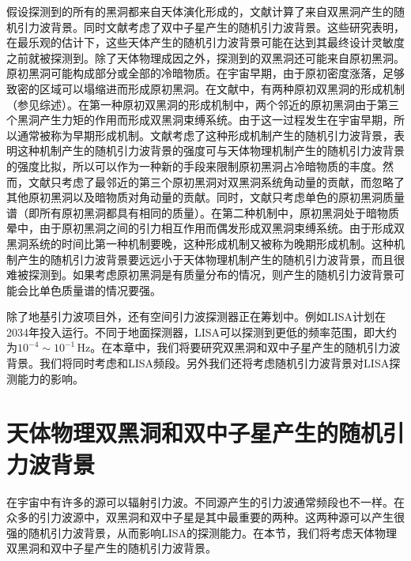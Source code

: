 假设\lvc 探测到的所有的黑洞都来自天体演化形成的\citep{Belczynski:2010tb,Miller:2016krr,TheLIGOScientific:2016htt,Belczynski:2016obo,Stevenson:2017tfq}，文献\cite{TheLIGOScientific:2016wyq,TheLIGOScientific:2016dpb}计算了来自双黑洞产生的随机引力波背景。同时文献\citep{Abbott:2017xzg}考虑了双中子星产生的随机引力波背景。这些研究表明，在最乐观的估计下，这些天体产生的随机引力波背景可能在\lvc 达到其最终设计灵敏度之前就被探测到。除了天体物理成因之外，\lvc 探测到的双黑洞还可能来自原初黑洞。原初黑洞可能构成部分或全部的冷暗物质。在宇宙早期，由于原初密度涨落，足够致密的区域可以塌缩进而形成原初黑洞\citep{Hawking:1971ei,Carr:1974nx}。在文献中，有两种原初双黑洞的形成机制（参见综述\cite{Garcia-Bellido:2017fdg,Sasaki:2018dmp}）。在第一种原初双黑洞的形成机制中，两个邻近的原初黑洞由于第三个黑洞产生力矩的作用而形成双黑洞束缚系统\citep{Nakamura:1997sm,Ioka:1998nz,Sasaki:2016jop}。由于这一过程发生在宇宙早期，所以通常被称为早期形成机制。文献\cite{Wang:2016ana,Raidal:2017mfl}考虑了这种形成机制产生的随机引力波背景，表明这种机制产生的随机引力波背景的强度可与天体物理机制产生的随机引力波背景的强度比拟，所以可以作为一种新的手段来限制原初黑洞占冷暗物质的丰度。然而，文献\cite{Raidal:2017mfl}只考虑了最邻近的第三个原初黑洞对双黑洞系统角动量的贡献，而忽略了其他原初黑洞以及暗物质对角动量的贡献。同时，文献\cite{Wang:2016ana}只考虑单色的原初黑洞质量谱（即所有原初黑洞都具有相同的质量）。在第二种机制中，原初黑洞处于暗物质晕中，由于原初黑洞之间的引力相互作用而偶发形成双黑洞束缚系统\citep{1989ApJ...343..725Q,Mouri:2002mc,Bird:2016dcv,Clesse:2016ajp,Clesse:2016vqa}。由于形成双黑洞系统的时间比第一种机制要晚，这种形成机制又被称为晚期形成机制。这种机制产生的随机引力波背景要远远小于天体物理机制产生的随机引力波背景，而且很难被\lvc 探测到\citep{Mandic:2016lcn}。如果考虑原初黑洞是有质量分布的情况，则产生的随机引力波背景可能会比单色质量谱的情况要强\citep{Clesse:2016ajp}。


除了地基引力波项目外，还有空间引力波探测器正在筹划中。例如LISA计划在2034年投入运行\citep{Audley:2017drz}。不同于\lvc 地面探测器，LISA可以探测到更低的频率范围，即大约为$10^{-4} \sim 10^{-1}\, \mathrm{Hz}$。在本章中，我们将要研究双黑洞和双中子星产生的随机引力波背景。我们将同时考虑\lvc 和LISA频段。另外我们还将考虑随机引力波背景对LISA探测能力的影响。

\section{天体物理双黑洞和双中子星产生的随机引力波背景\label{SBH}}
在宇宙中有许多的源可以辐射引力波。不同源产生的引力波通常频段也不一样。在众多的引力波源中，双黑洞和双中子星是其中最重要的两种。这两种源可以产生很强的随机引力波背景，从而影响LISA的探测能力。在本节，我们将考虑天体物理双黑洞和双中子星产生的随机引力波背景。

